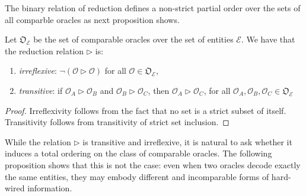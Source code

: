 The binary relation of reduction defines a non-strict partial order over the sets of all comparble oracles as next proposition shows.

\begin{proposition}
Let $\mathfrak{O}_{\mathcal{E}}$ be the set of comparable oracles over the set of entities $\mathcal{E}$. We have that the reduction relation $\triangleright$ is:
\begin{enumerate}
\item \emph{irreflexive}: $\neg(\mathcal{O} \triangleright \mathcal{O})$ for all $\mathcal{O} \in \mathfrak{O}_{\mathcal{E}}$,
\item \emph{transitive}: if $\mathcal{O}_A \triangleright \mathcal{O}_B$ and $\mathcal{O}_B \triangleright \mathcal{O}_C$, then $\mathcal{O}_A \triangleright \mathcal{O}_C$, for all $\mathcal{O}_A, \mathcal{O}_B, \mathcal{O}_C \in \mathfrak{O}_{\mathcal{E}}$
\end{enumerate}
\end{proposition}
\begin{proof}
Irreflexivity follows from the fact that no set is a strict subset of itself. Transitivity follows from transitivity of strict set inclusion.
\end{proof}

While the relation $\triangleright$ is transitive and irreflexive, it is natural to ask whether it induces a total ordering on the class of comparable oracles. The following proposition shows that this is not the case: even when two oracles decode exactly the same entities, they may embody different and incomparable forms of hard-wired information.

